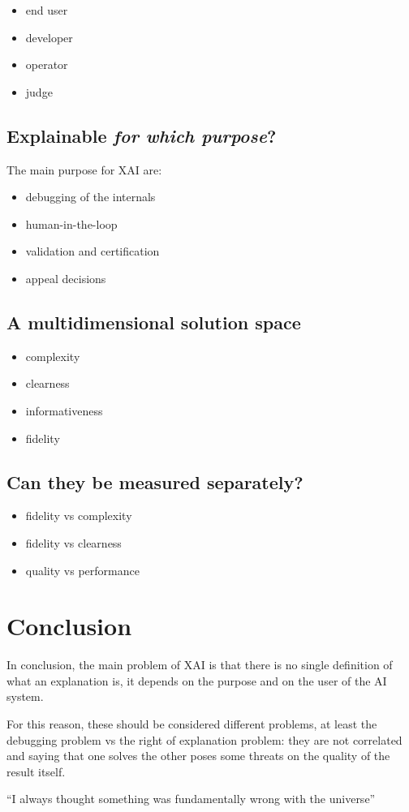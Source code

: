 \documentclass{article}
\begin{document}
\begin{itemize}
    \item end user
    \item developer
    \item operator
    \item judge
\end{itemize}

\subsection{Explainable \textit{for which purpose}?}

The main purpose for XAI are:

\begin{itemize}
    \item debugging of the internals
    \item human-in-the-loop
    \item validation and certification
    \item appeal decisions
\end{itemize}

\subsection{A multidimensional solution space}

\begin{itemize}
    \item complexity
    \item clearness
    \item informativeness
    \item fidelity
\end{itemize}

\subsection{Can they be measured separately?}

\begin{itemize}
    \item fidelity vs complexity
    \item fidelity vs clearness
    \item quality vs performance
\end{itemize}

\section{Conclusion}

In conclusion, the main problem of XAI is that there is no single definition of
what an explanation is, it depends on the purpose and on the user of the AI
system.

For this reason, these should be considered different problems, at least the
debugging problem vs the right of explanation problem: they are not correlated
and saying that one solves the other poses some threats on the quality of the
result itself.

``I always thought something was fundamentally wrong with the universe''



\end{document}
